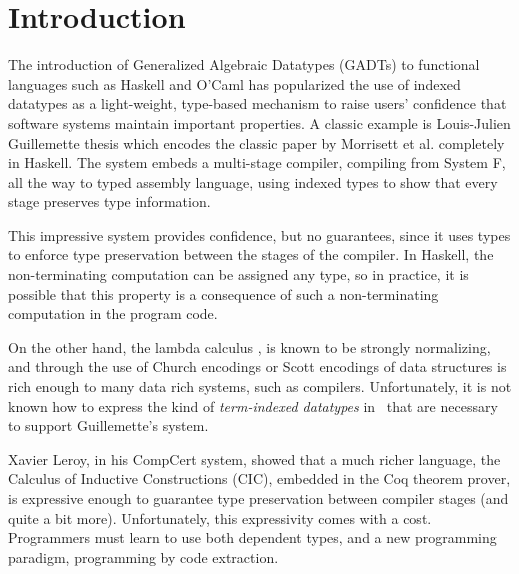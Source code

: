 \section{Introduction}
\label{sec:intro}


The introduction of Generalized Algebraic Datatypes (GADTs) to functional
languages such as Haskell and O'Caml has popularized the use of indexed datatypes
as a light-weight, type-based mechanism to raise users' confidence that software systems
maintain important properties. A classic example is 
Louis-Julien Guillemette thesis\cite{guillemetteThesis} which encodes the classic 
paper by Morrisett et al.\cite{tal-toplas} completely in Haskell. The 
system embeds a multi-stage compiler, compiling from System F, all the way
to typed assembly language, using indexed
types to show that every stage preserves type information.

This impressive system provides confidence, but no guarantees, since it uses types to enforce
type preservation between the stages of the compiler. In Haskell, the non-terminating computation
can be assigned any type, so in practice, it is possible that this property is a consequence
of such a non-terminating computation in the program code.

On the other hand, the lambda calculus \Fw, is known to be strongly normalizing, and
through the use of Church encodings or Scott encodings of data structures is rich enough
to many data rich systems, such as compilers. Unfortunately, it is not known
how to express the kind of \emph{term-indexed datatypes} in \Fw\ that are necessary to
support Guillemette's system.

Xavier Leroy, in his CompCert system\cite{Leroy-Compcert-CACM}, showed that a much richer
language, the Calculus of Inductive Constructions (CIC), embedded in the Coq theorem prover,
is expressive enough to guarantee type preservation between compiler stages
(and quite a bit more). Unfortunately, this expressivity comes with a cost.
Programmers must learn to use both dependent types, and a new programming
paradigm, programming by code extraction.

